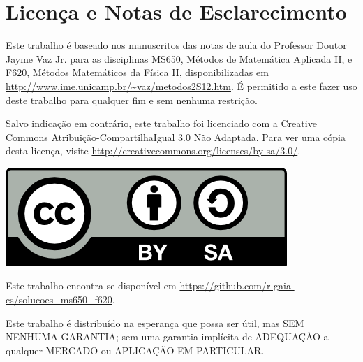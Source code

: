 %
%


\chapter{Licença e Notas de Esclarecimento}
Este trabalho é baseado nos manuscritos das notas de aula do Professor Doutor
Jayme Vaz Jr. para as disciplinas MS650, Métodos de Matemática Aplicada II, e
F620, Métodos Matemáticos da Física II, disponibilizadas em
\url{http://www.ime.unicamp.br/~vaz/metodos2S12.htm}. É permitido a este fazer
uso deste trabalho para qualquer fim e sem nenhuma restrição.

Salvo indicação em contrário, este trabalho foi licenciado com a Creative
Commons Atribuição-CompartilhaIgual 3.0 Não Adaptada. Para ver uma cópia desta
licença, visite \url{http://creativecommons.org/licenses/by-sa/3.0/}.
\begin{center}
  \includegraphics[keepaspectratio=true]{cc-by-sa.png}
\end{center}

Este trabalho encontra-se disponível em
\url{https://github.com/r-gaia-cs/solucoes_ms650_f620}.

Este trabalho é distribuído na esperança que possa ser útil, mas SEM NENHUMA
GARANTIA; sem uma garantia implícita de ADEQUA\c{C}\~{A}O a qualquer MERCADO ou
APLICA\c{C}\~{A}O EM PARTICULAR.
